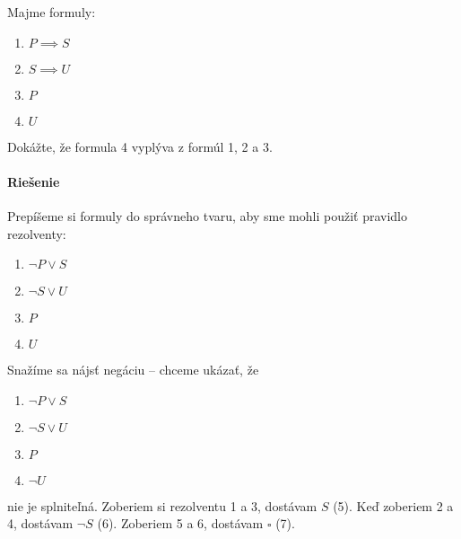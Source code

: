 \begin{priklad}
    Majme formuly:

    \begin{enumerate}
        \item $P\implies S$
        \item $S \implies U$
        \item $P$
        \item $U$
    \end{enumerate}

    Dokážte, že formula 4 vyplýva z formúl 1, 2 a 3. 

    \paragraph{Riešenie} Prepíšeme si formuly do správneho tvaru, aby sme mohli
    použiť pravidlo rezolventy:
    \begin{enumerate}
            \item $\neg P \lor S$
            \item $\neg S\lor U$
            \item $P$
            \item $U$
    \end{enumerate}
    Snažíme sa nájsť negáciu -- chceme ukázať, že 
    \begin{enumerate}
            \item $\neg P \lor S$
            \item $\neg S\lor U$
            \item $P$
            \item $\neg U$
    \end{enumerate}

    nie je splniteľná. Zoberiem si rezolventu 1 a 3, dostávam $S$ (5). Keď zoberiem 
    2 a 4, dostávam $\neg S$ (6). Zoberiem 5 a 6, dostávam $\square$ (7).
\end{priklad}


